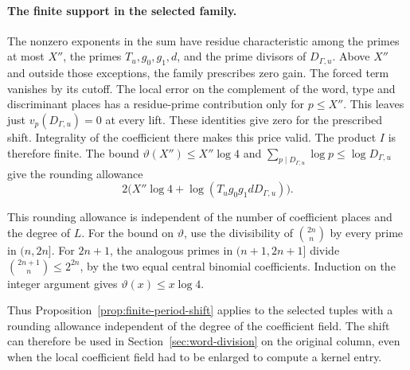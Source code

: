 \paragraph{The finite support in the selected family.}
The nonzero exponents in the sum have residue
characteristic among the primes at most \(X''\), the
primes \(T_u,g_0,g_1,d\), and the prime divisors of
\(D_{\Gamma,u}\). Above \(X''\) and outside those exceptions, the family prescribes zero gain. The forced term vanishes by its cutoff. The local error on the complement of the word, type and discriminant places has a residue-prime contribution only for \(p\le X''\). This leaves just \(v_p(D_{\Gamma,u})=0\)
at every lift. These identities give zero for the prescribed
shift. Integrality of the coefficient there makes this price valid. The product \(I\) is
therefore finite. The bound \(\vartheta(X'')\le X''\log4\)
and \(\sum_{p\mid D_{\Gamma,u}}\log p\le\log D_{\Gamma,u}\)
give the rounding allowance
\[
  2\bigl(X''\log4+\log(T_u g_0g_1d D_{\Gamma,u})\bigr).
\]

This rounding allowance is independent of the number of coefficient places
and the degree of \(L\).
For the bound on \(\vartheta\), use the divisibility of
\(\binom{2n}{n}\) by every prime in \((n,2n]\).
For \(2n+1\), the analogous primes in \((n+1,2n+1]\)
divide \(\binom{2n+1}{n}\le2^{2n}\), by the two equal
central binomial coefficients. Induction on the integer
argument gives \(\vartheta(x)\le x\log4\).

Thus Proposition~\ref{prop:finite-period-shift} applies to the
selected tuples with a rounding allowance independent of the
degree of the coefficient field. The shift can therefore be used in Section~\ref{sec:word-division} on the original column, even when the local coefficient field had to be enlarged to compute a kernel entry.
\label{cor:finite-valuations-1}
